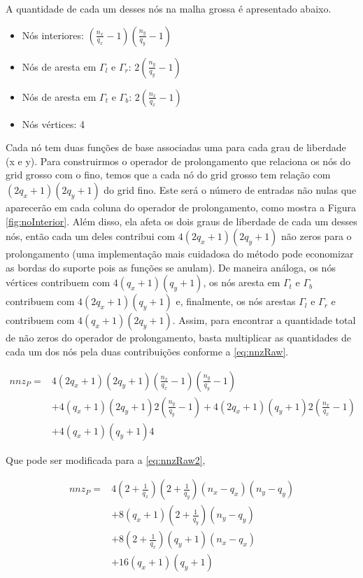 A quantidade de cada um desses nós na malha grossa é apresentado abaixo.

\begin{itemize}
    \item Nós interiores: $(\frac{n_x}{q_x} - 1) (\frac{n_y}{q_y} - 1)$
    \item Nós de aresta em $\Gamma_l$ e $\Gamma_r$: $2 ( \frac{n_y}{q_y} - 1)$
    \item Nós de aresta em $\Gamma_t$ e $\Gamma_b$: $2 ( \frac{n_x}{q_x} - 1)$
    \item Nós vértices: 4 
\end{itemize}


Cada nó tem duas funções de base associadas uma para cada grau de liberdade (x e y). Para construirmos o operador de prolongamento que relaciona os nós do grid grosso com o fino, temos que a cada nó do grid grosso tem relação com $(2q_x+1)(2q_y+1)$ do grid fino. Este será o número de entradas não nulas que aparecerão em cada coluna do operador de prolongamento, como mostra a Figura \ref{fig:noInterior}. Além disso, ela afeta os dois graus de liberdade de cada um desses nós, então cada um deles contribui com $4(2q_x+1)(2q_y+1)$  não zeros para o prolongamento (uma implementação mais cuidadosa do método pode economizar as bordas do suporte pois as funções se anulam). De maneira análoga, os nós vértices contribuem com $ 4 (q_x+1)(q_y+1)$, os nós aresta em $\Gamma_t$ e $\Gamma_b$ contribuem com $ 4 (2q_x+1)(q_y+1) $ e, finalmente, os nós arestas  $\Gamma_l$ e $\Gamma_r$ e contribuem com $ 4(q_x+1)(2q_y+1) $. Assim, para encontrar a quantidade total de não zeros do operador de prolongamento, basta multiplicar as quantidades de cada um dos nós pela duas contribuições conforme a   \eqref{eq:nnzRaw}. 


\begin{equation} \label{eq:nnzRaw}
\begin{aligned}
    nnz_P = & 4(2q_x+1)(2q_y+1)  (\frac{n_x}{q_x} - 1) (\frac{n_y}{q_y} - 1)   \\ 
            & + 4 (q_x+1)(2q_y+1)  2 ( \frac{n_y}{q_y} - 1) +  4 (2q_x+1)(q_y+1)  2 (\frac{n_x}{q_x} - 1) \\
            & +  4(q_x+1)(q_y+1) 4 
\end{aligned}
\end{equation}

Que pode ser modificada para a \eqref{eq:nnzRaw2},

\begin{equation} \label{eq:nnzRaw2}
\begin{aligned}
    nnz_P = &   4 (2+\frac{1}{q_x})(2 + \frac{1}{q_y})  (n_x - q_x) (n_y - q_y) \\ 
            & + 8 (q_x+1)(2 + \frac{1}{q_y})  (n_y - q_y) \\
            & + 8 (2+\frac{1}{q_x})(q_y+1) (n_x - q_x) \\
            & + 16 (q_x+1)(q_y+1)  
\end{aligned}
\end{equation}

